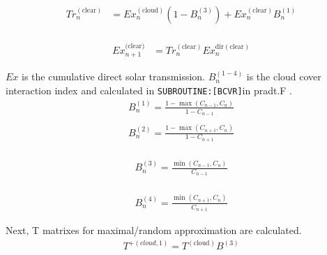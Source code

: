 \begin{equation}
\begin{aligned}
T r_{n}^{(\text {clear})} &=E x_{n}^{(\text {cloud})}\left(1-B_{n}^{(3)}\right)+E x_{n}^{(\text {clear})} B_{n}^{(1)} \\
\end{aligned}
\end{equation}

\begin{equation}
\begin{aligned}
E x_{n+1}^{(\text {clear)} }&={Tr}_{n}^{(\text {clear})} E x_{n}^{\text {dir}(\text {clear})}
\end{aligned}
\end{equation}

\(Ex\) is the cumulative direct solar transmission. \(B_{n}^{(1-4)}\) is
the cloud cover interaction index and calculated in
\texttt{SUBROUTINE:{[}BCVR{]}}in pradt.F . \begin{equation}
\begin{array}{l}
B_{n}^{(1)}=\frac{1-\max \left(C_{n-1}, C_{n}\right)}{1-C_{n-1}} \\
\end{array}
\end{equation} \begin{equation}
\begin{array}{l}
B_{n}^{(2)}=\frac{1-\max \left(C_{n+1}, C_{n}\right)}{1-C_{n+1}} \\
\end{array}
\end{equation}

\begin{equation}
\begin{array}{l}
B_{n}^{(3)}=\frac{\min \left(C_{n-1}, C_{n}\right)}{C_{n-1}} \\
\end{array}
\end{equation}

\begin{equation}
\begin{array}{l}
B_{n}^{(4)}=\frac{\min \left(C_{n+1}, C_{n}\right)}{C_{n+1}}
\end{array}
\end{equation}

Next, T matrixes for maximal/random approximation are calculated. \begin{equation}
\begin{array}{l}
T^{+(cloud, 1)}=T^{(\text {cloud})} B^{(3)} \\
\end{array}
\end{equation}

